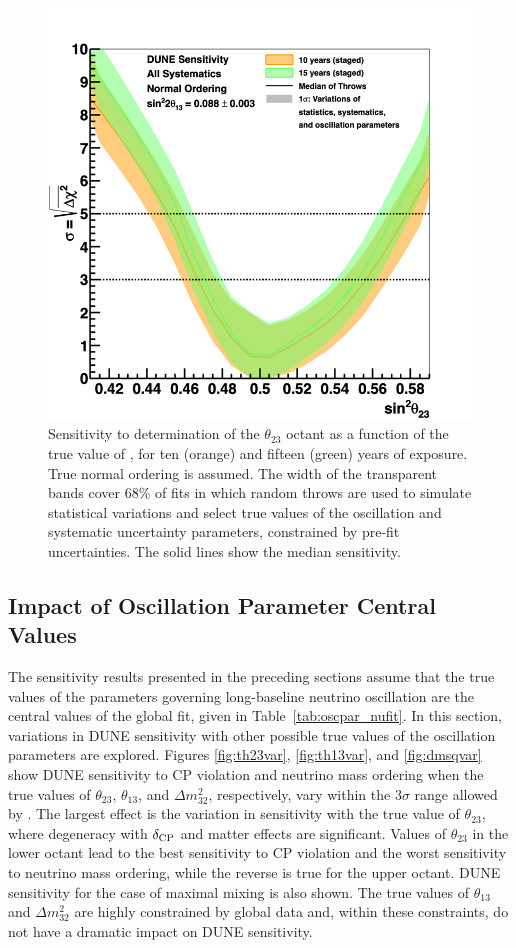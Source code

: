 \begin{figure}[h!]
    \centering
		\includegraphics[width=0.75\linewidth]{graphics/octant_no_2019_v4.png}
	\caption[Sensitivity of determination of the $\theta_{23}$ octant as a function of ]{Sensitivity to determination of the $\theta_{23}$ octant as a function of the true value of , for ten (orange) and fifteen (green) years of exposure. True normal ordering is assumed. The width of the transparent bands cover 68\% of fits in which random throws are used to simulate statistical variations and select true values of the oscillation and systematic uncertainty parameters, constrained by pre-fit uncertainties. The solid lines show the median sensitivity.}
    \label{fig:lbloctant}
\end{figure}

\subsection{Impact of Oscillation Parameter Central Values}
\label{sec:physics-lbnosc-oscvar}
The sensitivity results presented in the preceding sections assume that the true values of the parameters governing long-baseline neutrino oscillation are the central values of the  global fit, given in Table~\ref{tab:oscpar_nufit}. In this section, variations in DUNE sensitivity with other possible true values of the oscillation parameters are explored.
Figures \ref{fig:th23var}, \ref{fig:th13var}, and \ref{fig:dmsqvar} show DUNE sensitivity to CP violation and neutrino mass ordering when the true values of $\theta_{23}$, $\theta_{13}$, and $\Delta m^{2}_{32}$, respectively, vary within the 3$\sigma$ range allowed by . The largest effect is the variation in sensitivity with the true value of $\theta_{23}$, where degeneracy with $\delta_{\rm CP}$ and matter effects are significant. Values of $\theta_{23}$ in the lower octant lead to the best sensitivity to CP violation and the worst sensitivity to neutrino mass ordering, while the reverse is true for the upper octant. DUNE sensitivity for the case of maximal mixing is also shown. The true values of $\theta_{13}$ and $\Delta m^2_{32}$ are highly constrained by global data and, within these constraints, do not have a dramatic impact on DUNE sensitivity.  

